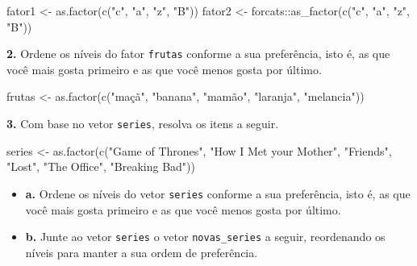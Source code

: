 \documentclass[
]{book}
\newenvironment{Shaded}{\begin{snugshade}}{\end{snugshade}}
\newcommand{\FunctionTok}[1]{\textcolor[rgb]{0.00,0.00,0.00}{#1}}
\newcommand{\NormalTok}[1]{#1}
\newcommand{\OtherTok}[1]{\textcolor[rgb]{0.56,0.35,0.01}{#1}}
\newcommand{\SpecialCharTok}[1]{\textcolor[rgb]{0.00,0.00,0.00}{#1}}
\newcommand{\StringTok}[1]{\textcolor[rgb]{0.31,0.60,0.02}{#1}}
\begin{document}
\begin{Shaded}
\begin{Highlighting}[]
\NormalTok{fator1 }\OtherTok{\textless{}{-}} \FunctionTok{as.factor}\NormalTok{(}\FunctionTok{c}\NormalTok{(}\StringTok{"c"}\NormalTok{, }\StringTok{"a"}\NormalTok{, }\StringTok{"z"}\NormalTok{, }\StringTok{"B"}\NormalTok{))}
\NormalTok{fator2 }\OtherTok{\textless{}{-}}\NormalTok{ forcats}\SpecialCharTok{::}\FunctionTok{as\_factor}\NormalTok{(}\FunctionTok{c}\NormalTok{(}\StringTok{"c"}\NormalTok{, }\StringTok{"a"}\NormalTok{, }\StringTok{"z"}\NormalTok{, }\StringTok{"B"}\NormalTok{))}
\end{Highlighting}
\end{Shaded}

\textbf{2.} Ordene os níveis do fator \texttt{frutas} conforme a sua preferência, isto é, as que você mais gosta primeiro e as que você menos gosta por último.

\begin{Shaded}
\begin{Highlighting}[]
\NormalTok{frutas }\OtherTok{\textless{}{-}} \FunctionTok{as.factor}\NormalTok{(}\FunctionTok{c}\NormalTok{(}\StringTok{"maçã"}\NormalTok{, }\StringTok{"banana"}\NormalTok{, }\StringTok{"mamão"}\NormalTok{, }\StringTok{"laranja"}\NormalTok{, }\StringTok{"melancia"}\NormalTok{))}
\end{Highlighting}
\end{Shaded}

\textbf{3.} Com base no vetor \texttt{series}, resolva os itens a seguir.

\begin{Shaded}
\begin{Highlighting}[]
\NormalTok{series }\OtherTok{\textless{}{-}} \FunctionTok{as.factor}\NormalTok{(}\FunctionTok{c}\NormalTok{(}\StringTok{"Game of Thrones"}\NormalTok{, }\StringTok{"How I Met your Mother"}\NormalTok{, }\StringTok{"Friends"}\NormalTok{, }\StringTok{"Lost"}\NormalTok{, }\StringTok{"The Office"}\NormalTok{, }\StringTok{"Breaking Bad"}\NormalTok{))}
\end{Highlighting}
\end{Shaded}

\begin{itemize}
\item
  \textbf{a.} Ordene os níveis do vetor \texttt{series} conforme a sua preferência, isto é, as que você mais gosta primeiro e as que você menos gosta por último.
\item
  \textbf{b.} Junte ao vetor \texttt{series} o vetor \texttt{novas\_series} a seguir, reordenando os níveis para manter a sua ordem de preferência.
\end{itemize}
\end{document}
